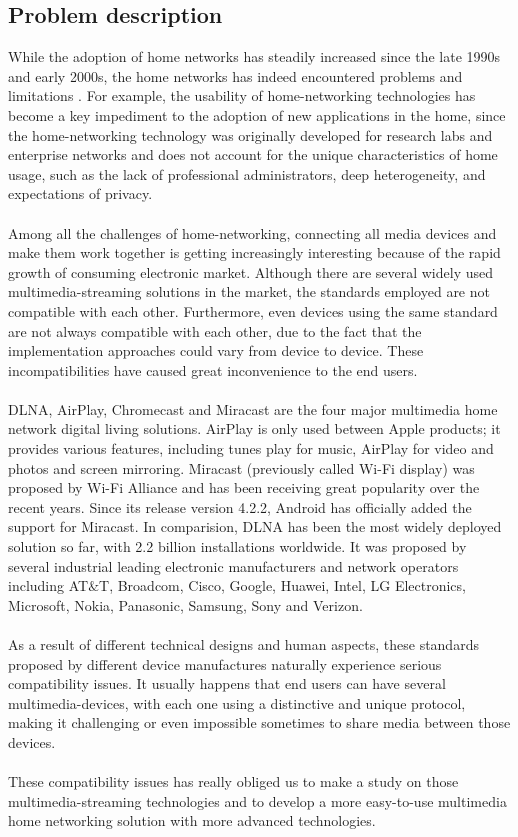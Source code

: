 \subsection{Problem description}
While the adoption of home networks has steadily increased since the late 1990s
and early 2000s, the home networks has indeed encountered problems and limitations
\cite{stateofHN}. For example, the usability of home-networking technologies has become
a key impediment to the adoption of new applications in the home, since the home-networking technology was originally developed for
 research labs and enterprise networks and does not account for the unique
 characteristics of home usage, such as the lack of professional administrators, deep
heterogeneity, and expectations of privacy.\\
\\
Among all the challenges of home-networking, connecting all media devices and make them work together is getting increasingly interesting because of the rapid growth of consuming electronic market. Although there are
 several widely used multimedia-streaming solutions in the market, the 
standards employed are not compatible with each other. Furthermore, even devices using
the same standard are not always compatible with each other, due to the fact
that the implementation approaches could vary from device to device. These
incompatibilities have caused great inconvenience to the end users.\\
\\
DLNA, AirPlay, Chromecast and Miracast are the four major multimedia home network
digital living solutions. AirPlay is only used between Apple products; it
provides various features, including tunes play for music, AirPlay for video
and photos and screen mirroring. Miracast (previously called Wi-Fi display) was
proposed by Wi-Fi Alliance and has been receiving great popularity over the recent years.
Since its release version 4.2.2, Android has officially added the support for Miracast. In comparision, DLNA has been the most widely deployed solution so far, with 2.2 billion installations worldwide.
It was proposed by several industrial leading electronic manufacturers and network operators 
including AT$\&$T, Broadcom, Cisco, Google, Huawei, Intel, LG Electronics, Microsoft, Nokia, 
Panasonic, Samsung, Sony and Verizon.\\
\\
As a result of different technical designs and  human aspects, these standards proposed by
different device manufactures naturally experience serious compatibility issues. It usually happens that
end users can have several multimedia-devices, with each one using a
distinctive and unique  protocol, making it challenging or even impossible
sometimes to share media between those devices.\\
\\
These compatibility issues has really obliged us to make a study on those multimedia-streaming
 technologies and to develop a more easy-to-use multimedia home networking solution
 with more  advanced technologies.

